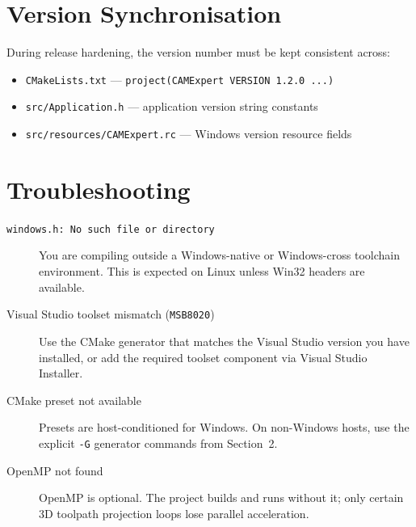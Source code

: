 \documentclass[11pt,a4paper]{article}
\begin{document}
\section{Version Synchronisation}

During release hardening, the version number must be kept consistent across:

\begin{itemize}
  \item \texttt{CMakeLists.txt} --- \texttt{project(CAMExpert VERSION 1.2.0 ...)}
  \item \texttt{src/Application.h} --- application version string constants
  \item \texttt{src/resources/CAMExpert.rc} --- Windows version resource fields
\end{itemize}

\section{Troubleshooting}

\begin{description}
  \item[\texttt{windows.h: No such file or directory}]
    You are compiling outside a Windows-native or Windows-cross toolchain
    environment.  This is expected on Linux unless Win32 headers are available.

  \item[Visual Studio toolset mismatch (\texttt{MSB8020})]
    Use the CMake generator that matches the Visual Studio version you have
    installed, or add the required toolset component via Visual Studio
    Installer.

  \item[CMake preset not available]
    Presets are host-conditioned for Windows.  On non-Windows hosts, use the
    explicit \texttt{-G} generator commands from Section~2.

  \item[OpenMP not found]
    OpenMP is optional.  The project builds and runs without it; only certain
    3D toolpath projection loops lose parallel acceleration.
\end{description}
\end{document}
